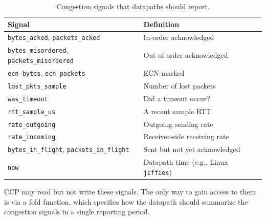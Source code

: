 \begin{table}
    \centering
    \footnotesize
    \begin{tabular}{p{}p{}}
      \textbf{Signal} & \textbf{Definition} \\
      \hline
        \texttt{bytes\_acked}, \texttt{packets\_acked} & In-order acknowledged \\
        \texttt{bytes\_misordered}, \texttt{packets\_misordered} & Out-of-order acknowledged \\
        \texttt{ecn\_bytes}, \texttt{ecn\_packets} & ECN-marked \\
        \texttt{lost\_pkts\_sample} & Number of lost packets \\
        \texttt{was\_timeout} & Did a timeout occur? \\
        \texttt{rtt\_sample\_us} & A recent sample RTT \\
        \texttt{rate\_outgoing} & Outgoing sending rate \\
        \texttt{rate\_incoming} & Receiver-side receiving rate  \\
        \texttt{bytes\_in\_flight}, \texttt{packets\_in\_flight} & Sent but not yet acknowledged \\
        \texttt{now} & Datapath time (e.g., Linux \texttt{jiffies})\\
    \end{tabular}
    \vspace{0.075in}
    \caption{Congestion signals that datapaths should report.}\label{tab:datapath:signals}
\end{table}

CCP may read but not write these signals. The only way to gain access to them is via a fold function, which specifies how the datapath should summarize the congestion signals in a single reporting period. 


%

